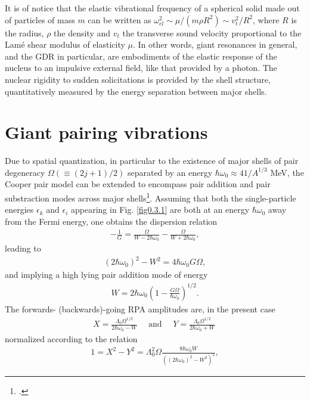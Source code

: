 It is of notice that the elastic vibrational frequency of a spherical solid made out of particles of mass $m$ can be written as $\omega_{el}^2\sim\mu/(m\rho R^2)\sim v_t^2/R^2$, where $R$ is the radius, $\rho$ the density and $v_t$ the transverse sound velocity proportional to the Lam\'e shear modulus of elasticity $\mu$.
In other words, giant resonances in general, and the GDR in particular, are embodiments of the elastic response of the nucleus to an impulsive external field, like that provided by a photon. The nuclear rigidity to sudden solicitations is provided by the shell structure, quantitatively measured by the energy separation between major shells.
\section{Giant pairing vibrations}\label{Sect2.6}
Due to spatial quantization, in particular to the existence of major shells of pair degeneracy $\Omega(\equiv(2j+1)/2)$ separated by an energy $\hbar\omega_0\approx41/A^{1/3}$ MeV, the Cooper pair model can be extended to encompass pair addition and pair substraction modes across major shells\footnote{\cite{Broglia:77}.}. Assuming that both the single-particle energies $\epsilon_k$ and $\epsilon_i$ appearing in Fig. \ref{fig0.3.1} are both at an energy    $\hbar\omega_0$ away from the Fermi energy, one obtains the dispersion relation 
\begin{align}\label{eq0.1.108}
-\frac{1}{G}=\frac{\Omega}{W-2\hbar\omega_0}-\frac{\Omega}{W+2\hbar\omega_0},
\end{align}
leading to
\begin{align}\label{eq0.1.109}
(2\hbar\omega_0)^2-W^2=4\hbar\omega_0G\Omega,
\end{align}
and implying a high lying pair addition mode of energy
\begin{align}\label{eq0.1.110}
W=2\hbar\omega_0\left(1-\frac{G\Omega}{\hbar\omega_0}\right)^{1/2}.
\end{align}
The forwards- (backwards)-going RPA amplitudes are, in the present case
\begin{align}\label{eq0.1.111}
X=\frac{\Lambda_0\Omega^{1/2}}{2\hbar\omega_0-W}\quad\text{ and      }\quad Y=\frac{\Lambda_0\Omega^{1/2}}{2\hbar\omega_0+W}\
\end{align}
normalized according to the relation 
\begin{align}\label{eq0.1.112}
1=X^2-Y^2=\Lambda^2_0\Omega\frac{8\hbar\omega_0W}{\left((2\hbar\omega_0)^2-W^2\right)^2},
\end{align}
